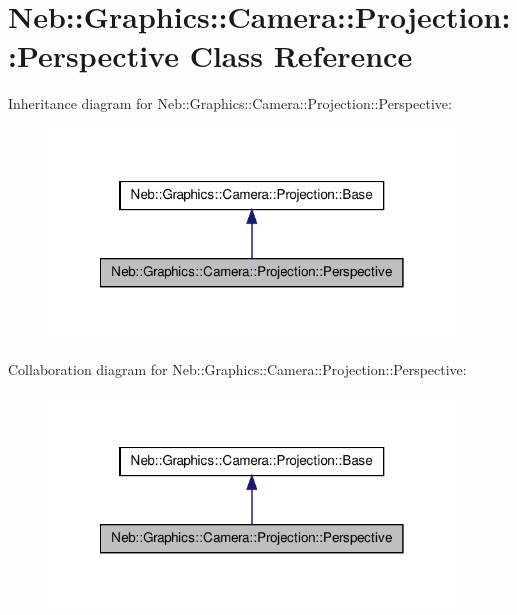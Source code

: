 \hypertarget{classNeb_1_1Graphics_1_1Camera_1_1Projection_1_1Perspective}{\section{\-Neb\-:\-:\-Graphics\-:\-:\-Camera\-:\-:\-Projection\-:\-:\-Perspective \-Class \-Reference}
\label{classNeb_1_1Graphics_1_1Camera_1_1Projection_1_1Perspective}
}


\-Inheritance diagram for \-Neb\-:\-:\-Graphics\-:\-:\-Camera\-:\-:\-Projection\-:\-:\-Perspective\-:\nopagebreak
\begin{figure}[H]
\begin{center}
\leavevmode
\includegraphics[width=306pt]{classNeb_1_1Graphics_1_1Camera_1_1Projection_1_1Perspective__inherit__graph}
\end{center}
\end{figure}


\-Collaboration diagram for \-Neb\-:\-:\-Graphics\-:\-:\-Camera\-:\-:\-Projection\-:\-:\-Perspective\-:\nopagebreak
\begin{figure}[H]
\begin{center}
\leavevmode
\includegraphics[width=306pt]{classNeb_1_1Graphics_1_1Camera_1_1Projection_1_1Perspective__coll__graph}
\end{center}
\end{figure}
